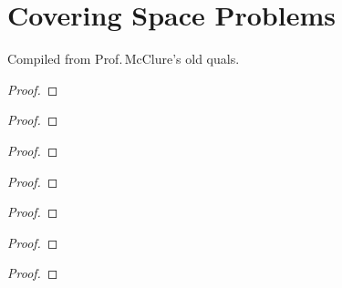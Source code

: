 \chapter{Covering Space Problems}
Compiled from Prof.\,McClure's old quals.
\begin{problem}

\end{problem}
\begin{proof}
\end{proof}

\begin{problem}
\end{problem}
\begin{proof}
\end{proof}

\begin{problem}
\end{problem}
\begin{proof}
\end{proof}

\begin{problem}
\end{problem}
\begin{proof}
\end{proof}

\begin{problem}
\end{problem}
\begin{proof}
\end{proof}

\begin{problem}
\end{problem}
\begin{proof}
\end{proof}

\begin{problem}
\end{problem}
\begin{proof}
\end{proof}
